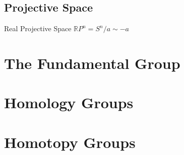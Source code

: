 \documentclass{article}
\begin{document}
    \subsection{Projective Space}
    \begin{defn}
        Real Projective Space $\mathbb{R}P^{n}=S^{n} / a \sim -a$
    \end{defn}
\section{The Fundamental Group}

\section{Homology Groups}

\section{Homotopy Groups}
\end{document}
